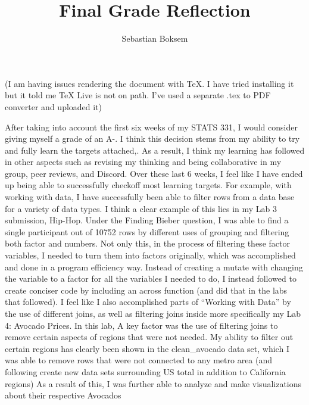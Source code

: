 \documentclass[
  letterpaper,
  DIV=11,
  numbers=noendperiod]{scrartcl}
\title{Final Grade Reflection}
\author{Sebastian Boksem}
\date{}
\begin{document}
\maketitle
\ifdefined\Shaded\renewenvironment{Shaded}{\begin{tcolorbox}[frame hidden, sharp corners, interior hidden, boxrule=0pt, enhanced, borderline west={3pt}{0pt}{shadecolor}, breakable]}{\end{tcolorbox}}\fi

(I am having issues rendering the document with TeX. I have tried
installing it but it told me TeX Live is not on path. I've used a
separate .tex to PDF converter and uploaded it)

After taking into account the first six weeks of my STATS 331, I would
consider giving myself a grade of an A-. I think this decision stems
from my ability to try and fully learn the targets attached,. As a
result, I think my learning has followed in other aspects such as
revising my thinking and being collaborative in my group, peer reviews,
and Discord. Over these last 6 weeks, I feel like I have ended up being
able to successfully checkoff most learning targets. For example, with
working with data, I have successfully been able to filter rows from a
data base for a variety of data types. I think a clear example of this
lies in my Lab 3 submission, Hip-Hop. Under the Finding Bieber question,
I was able to find a single participant out of 10752 rows by different
uses of grouping and filtering both factor and numbers. Not only this,
in the process of filtering these factor variables, I needed to turn
them into factors originally, which was accomplished and done in a
program efficiency way. Instead of creating a mutate with changing the
variable to a factor for all the variables I needed to do, I instead
followed to create conciser code by including an across function (and
did that in the labs that followed). I feel like I also accomplished
parts of ``Working with Data'' by the use of different joins, as well as
filtering joins inside more specifically my Lab 4: Avocado Prices. In
this lab, A key factor was the use of filtering joins to remove certain
aspects of regions that were not needed. My ability to filter out
certain regions has clearly been shown in the clean\_avocado data set,
which I was able to remove rows that were not connected to any metro
area (and following create new data sets surrounding US total in
addition to California regions) As a result of this, I was further able
to analyze and make visualizations about their respective Avocados
\end{document}
